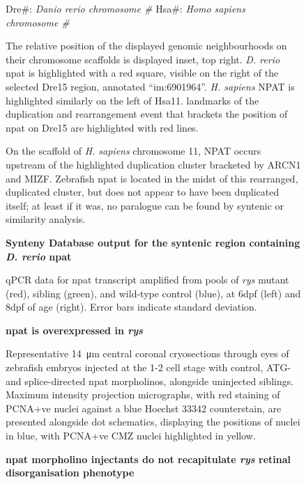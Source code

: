 \begin{sidewaysfigure}[!h]
    \caption{{\bf Synteny Database output for the syntenic region containing \textit{D. rerio} npat}}
    Dre\#: \textit{Danio rerio chromosome \#}
    Hsa\#: \textit{Homo sapiens chromosome \#}

    The relative position of the displayed genomic neighbourhoods on their chromosome scaffolds is displayed inset, top right. \textit{D. rerio} npat is highlighted with a red square, visible on the right of the selected Dre15 region, annotated ``im:6901964''. \textit{H. sapiens} NPAT is highlighted similarly on the left of Hsa11. landmarks of the duplication and rearrangement event that brackets the position of npat on Dre15 are highlighted with red lines.

    On the scaffold of \textit{H. sapiens} chromosome 11, NPAT occurs upstream of the highlighted duplication cluster bracketed by ARCN1 and MIZF. Zebrafish npat is located in the midst of this rearranged, duplicated cluster, but does not appear to have been duplicated itself; at least if it was, no paralogue can be found by syntenic or similarity analysis.
    \label{synteny}
\end{sidewaysfigure}

\begin{figure}[!h]
    \caption{{\bf npat is overexpressed in \textit{rys}}}
    qPCR data for npat transcript amplified from pools of \textit{rys} mutant (red), sibling (green), and wild-type control (blue), at 6dpf (left) and 8dpf of age (right). Error bars indicate standard deviation. 
    \label{npatrtpcr}
\end{figure}

\begin{figure}[!h]
    \caption{{\bf npat morpholino injectants do not recapitulate \textit{rys} retinal disorganisation phenotype}}
    Representative \SI{14}{\micro\metre} central coronal cryosections through eyes of zebrafish embryos injected at the 1-2 cell stage with control, ATG- and splice-directed npat morpholinos, alongside uninjected siblings. Maximum intensity projection micrographs, with red staining of PCNA+ve nuclei against a blue Hoechst 33342 counterstain, are presented alongside dot schematics, displaying the positions of nuclei in blue, with PCNA+ve CMZ nuclei highlighted in yellow.
    \label{morpholinoschematic}
\end{figure}

